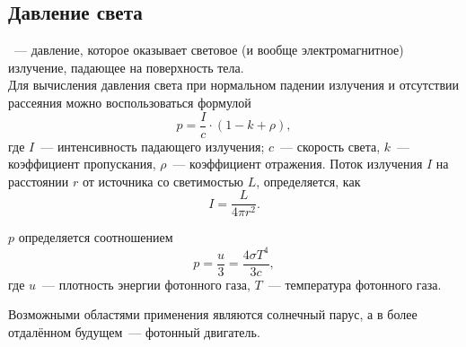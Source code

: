\subsection{Давление света}
~--- давление, которое оказывает световое (и вообще электромагнитное) излучение, падающее на поверхность тела.\\
Для вычисления давления света при нормальном падении излучения и отсутствии рассеяния можно воспользоваться формулой
\begin{equation}
p = \frac{I}{c} \cdot (1-k+\rho),
\end{equation}
где $I$~--- интенсивность падающего излучения; $c$~--- скорость света, $k$~--- коэффициент пропускания, $\rho$~--- коэффициент отражения.
Поток излучения $I$ на расстоянии $r$ от источника со светимостью $L$, определяется, как
\begin{equation}
I=\frac{L}{4\pi r^2}.
\end{equation}

 $p$ определяется соотношением
\begin{equation}
p = \frac{u}{3} = \frac{4 \sigma T^4}{3c},
\end{equation}
где $u$~--- плотность энергии фотонного газа, $T$~--- температура фотонного газа.

Возможными областями применения являются солнечный парус, а в более отдалённом будущем~--- фотонный двигатель.